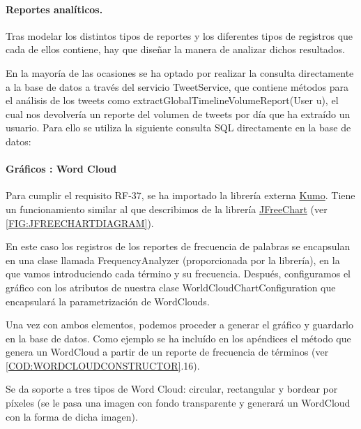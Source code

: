 \paragraph{Reportes analíticos.}
Tras modelar los distintos tipos de reportes y los diferentes tipos de registros que cada de ellos contiene, hay que diseñar la manera de analizar dichos resultados. 

En la mayoría de las ocasiones se ha optado por realizar la consulta directamente a la base de datos a través del servicio TweetService, que contiene métodos para el análisis de los tweets como extractGlobalTimelineVolumeReport(User u), el cual nos devolvería un reporte del volumen de tweets por día que ha extraído un usuario. Para ello se utiliza la siguiente consulta SQL directamente en la base de datos:


\paragraph{Gráficos : Word Cloud}
Para cumplir el requisito RF-37, se ha importado la librería externa \href{https://github.com/kennycason/kumo}{Kumo}. Tiene un funcionamiento similar al que describimos de la librería \href{http://www.jfree.org/jfreechart/}{JFreeChart} (ver \ref{FIG:JFREECHARTDIAGRAM}). 

En este caso los registros de los reportes de frecuencia de palabras se encapsulan en una clase llamada FrequencyAnalyzer (proporcionada por la librería), en la que vamos introduciendo cada término y su frecuencia. Después, configuramos el gráfico con los atributos de nuestra clase WorldCloudChartConfiguration que encapsulará la parametrización de WordClouds. 

Una vez con ambos elementos, podemos proceder a generar el gráfico y guardarlo en la base de datos. Como ejemplo se ha incluído en los apéndices el método que genera un WordCloud a partir de un reporte de frecuencia de términos (ver \cref{COD:WORDCLOUDCONSTRUCTOR}.16).

Se da soporte a tres tipos de Word Cloud: circular, rectangular y bordear por píxeles (se le pasa una imagen con fondo transparente y generará un WordCloud con la forma de dicha imagen).\newpage


